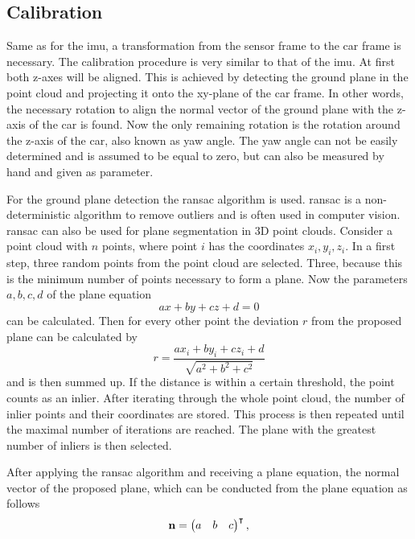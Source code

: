 \subsection{Calibration}
\label{ssec:calibration_lidar}
Same as for the \gls{imu}, a transformation from the sensor frame to the car frame is necessary.
The calibration procedure is very similar to that of the \gls{imu}.
At first both z-axes will be aligned.
This is achieved by detecting the ground plane in the point cloud and projecting it onto the xy-plane of the car frame.
In other words, the necessary rotation to align the normal vector of the ground plane with the z-axis of the car is found.
Now the only remaining rotation is the rotation around the z-axis of the car, also known as yaw angle.
The yaw angle can not be easily determined and is assumed to be equal to zero, but can also be measured by hand and given as parameter.\par
For the ground plane detection the \gls{ransac} algorithm \cite{Fischler1981} is used.
\gls{ransac} is a non-deterministic algorithm to remove outliers and is often used in computer vision.
\gls{ransac} can also be used for plane segmentation in 3D point clouds.
Consider a point cloud with $n$ points, where point $i$ has the coordinates $x_i, y_i, z_i$.
In a first step, three random points from the point cloud are selected.
Three, because this is the minimum number of points necessary to form a plane.
Now the parameters $a, b, c, d$ of the plane equation
\begin{equation}
	ax + by + cz + d = 0
\end{equation}
can be calculated.
Then for every other point the deviation $r$ from the proposed plane can be calculated by
\begin{equation}
	r = \frac{ax_i + by_i + cz_i + d}{\sqrt{a^2 + b^2 + c^2}}
\end{equation}
and is then summed up.
If the distance is within a certain threshold, the point counts as an inlier.
After iterating through the whole point cloud, the number of inlier points and their coordinates are stored.
This process is then repeated until the maximal number of iterations are reached.
The plane with the greatest number of inliers is then selected.\par
After applying the \gls{ransac} algorithm and receiving a plane equation, the normal vector of the proposed plane, which can be conducted from the plane equation as follows
\begin{equation}
	\vb{n} = \begin{pmatrix} a & b & c \end{pmatrix}^{\intercal},
\end{equation}
